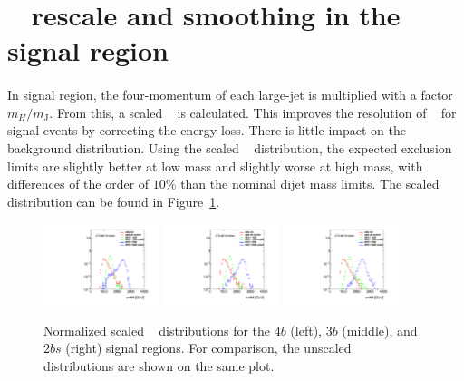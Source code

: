 \section{\mtwoJ~ rescale and smoothing in the signal region}
\label{sec:boosted-SR-smoothing}

\paragraph{}
In signal region, the four-momentum of each large-\R jet is multiplied with a factor $m_{H}/m_{\mathrm{J}}$.
From this, a scaled \mtwoJ~ is calculated.
This improves the resolution of \mtwoJ~ for signal events by correcting the energy loss.
There is little impact on the background distribution.
Using the scaled \mtwoJ~ distribution, the expected exclusion limits are slightly better at low mass and slightly worse at high mass, with differences of the order of $10\%$ than the nominal dijet mass limits.
The scaled \mtwoJ~ distribution can be found in Figure~\ref{fig:signal-region-bkg-scaled}.

\begin{figure}[htbp!]
\begin{center}
\includegraphics[width=0.3\textwidth,angle=-90]{figures/boosted/Other/FourTag_Signal_compare_scale_mHH_1.pdf}
\includegraphics[width=0.3\textwidth,angle=-90]{figures/boosted/Other/ThreeTag_Signal_compare_scale_mHH_1.pdf}
\includegraphics[width=0.3\textwidth,angle=-90]{figures/boosted/Other/TwoTag_split_Signal_compare_scale_mHH_1.pdf}
\caption{Normalized scaled \mtwoJ~ distributions for the $4b$ (left), $3b$ (middle), and $2bs$ (right) signal regions. For comparison, the unscaled  \mtwoJ~ distributions are shown on the same plot. }
\label{fig:signal-region-bkg-scaled}
\end{center}
\end{figure}

